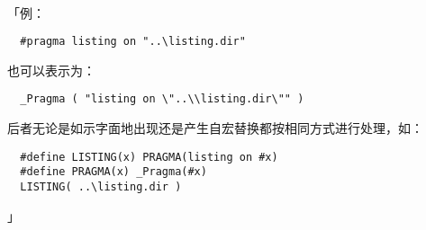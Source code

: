 \paragraph{}
「例：
\begin{lstlisting}
  #pragma listing on "..\listing.dir"
\end{lstlisting}
也可以表示为：
\begin{lstlisting}
  _Pragma ( "listing on \"..\\listing.dir\"" )
\end{lstlisting}
后者无论是如示字面地出现还是产生自宏替换都按相同方式进行处理，如：
\begin{lstlisting}
  #define LISTING(x) PRAGMA(listing on #x)
  #define PRAGMA(x) _Pragma(#x)
  LISTING( ..\listing.dir )
\end{lstlisting}」
